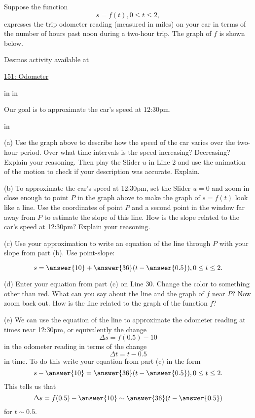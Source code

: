 \documentclass{ximera}
\newcommand{\pskip}{\vskip 0.1 in}
\begin{document}
\begin{example} \label{Ex:ldfdtgjh5}
Suppose the function
\[
    s = f(t) , 0\leq t \leq 2 ,
\]
expresses the trip odometer reading (measured in miles) on your car in terms of the number of hours past noon during a two-hour trip. The graph of $f$  is shown below.

 
\begin{onlineOnly}
    \begin{center}
\end{center}
\end{onlineOnly}

Desmos activity available at

\href{https://www.desmos.com/calculator/tumgpu4n0w}{151: Odometer}

\pskip \pskip

Our goal is to approximate the car's speed at 12:30pm.

\pskip

(a) Use the graph above to describe how the speed of the car varies over the two-hour period. Over what time intervals is the speed increasing? Decreasing? Explain your reasoning. Then play the Slider $u$ in Line 2 and use the animation of the motion to check if your description was accurate. Explain.

(b) To approximate the car's speed at 12:30pm, set the Slider $u=0$ and zoom in close enough to point $P$ in the graph above to make the graph of $s=f(t)$ look like a line. Use the coordinates of point $P$ and a second point in the window far away from $P$ to estimate the slope of this line. How is the slope related to the car's speed at 12:30pm? Explain your reasoning.

(c) Use your approximation to write an equation of the line through $P$ with your slope from part (b). Use point-slope:
\begin{question}  \label{Q:3422d3}
\[
     s =  \answer{10} + \answer{36}(t - \answer{0.5}) , 0\leq t \leq 2 .
\]

(d) Enter your equation from part (c) on Line 30. Change the color to something other than red. What can you say about the line and the graph of $f$ near $P$? Now zoom back out. How is the line related to the graph of the function $f$?

(e) We can use the equation of the line to approximate the odometer reading at times near 12:30pm, or equivalently the change
\[
   \Delta s = f(0.5) - 10
\]
in the odometer reading in terms of the change
\[
   \Delta t = t -0.5
\]   
in time. To do this write your equation from part (c) in the form
\[
      s - \answer{10}= \answer{36}(t - \answer{0.5}) , 0\leq t \leq 2 .
\]
This tells us that 
\[
      \Delta s = f(0.5) - \answer{10} \sim  \answer{36}(t - \answer{0.5}) 
\]
for $t\sim 0.5$.


\end{question}
\end{example}
\end{document}
